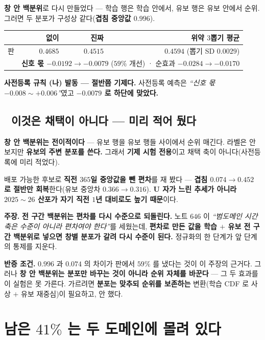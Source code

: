 \documentclass[10pt,a4paper]{article}
\newcommand{\claim}[2]{\begin{claimbox}\textbf{주장.} #1\par\smallskip
  \textcolor{gray!70}{\textbf{반증 조건.} #2}\end{claimbox}}
\begin{document}
\textbf{창 안 백분위}로 다시 만들었다 --- 학습 행은 학습 안에서, 유보 행은 유보
안에서 순위. 그러면 두 분포가 구성상 같다(\textbf{겹침 중앙값 $0.996$}).

\begin{center}
\begin{tabular}{lrrr}
\toprule
& 없이 & 진짜 & 위약 $3$뽑기 평균 \\
\midrule
판 & $0.4685$ & $\mathbf{0.4515}$ & $0.4594$ (뽑기 SD $0.0029$) \\
\midrule
& \multicolumn{3}{l}{\textbf{신호 몫 $-0.0192 \to \mathbf{-0.0079}$} ($59\%$ 개선) ·
순효과 $-0.0284 \to -0.0170$} \\
\bottomrule
\end{tabular}
\end{center}

\textbf{사전등록 규칙 (나) 발동 --- 절반쯤 기제다.} 사전등록 예측은 \emph{``신호 몫
$-0.008 \sim +0.006$''}였고 \textbf{$-0.0079$ 로 하단에 맞았다.}

\subsection*{🔴 이것은 채택이 아니다 --- 미리 적어 뒀다}

\textbf{창 안 백분위는 전이적이다} --- 유보 행을 유보 행들 사이에서 순위 매긴다.
라벨은 안 보지만 \textbf{유보의 주변 분포를 쓴다.} 그래서 \textbf{기제 시험 전용}이고
채택 축이 아니다(사전등록에 미리 적었다).

배포 가능한 후보로 \textbf{직전 $365$일 중앙값을 뺀 편차}를 재 봤다 --- \textbf{겹침
$0.074 \to 0.452$ 로 절반만 회복}한다(유보 중앙차 $0.366 \to 0.316$). \textbf{U 자가
느린 추세가 아니라 $2025{\sim}26$ 산포가 자기 직전 $1$년 대비로도 높기 때문}이다.

\claim{\textbf{전 구간 백분위는 편차를 다시 수준으로 되돌린다.} 노트 $646$ 이
\emph{``범도메인 시간축은 수준이 아니라 편차여야 한다''}를 세웠는데, \textbf{편차로
만든 값을 학습 $+$ 유보 전 구간 백분위로 넣으면 창별 분포가 갈려 다시 수준이 된다.}
정규화의 한 단계가 앞 단계의 통제를 지운다.}
{$0.996$ 과 $0.074$ 의 차이가 판에서 $59\%$ 를 냈다는 것이 이 주장의 근거다. 그러나
\textbf{창 안 백분위는 분포만 바꾸는 것이 아니라 순위 자체를 바꾼다} --- 그 두 효과를
이 실험은 못 가른다. 가르려면 \textbf{분포는 맞추되 순위를 보존하는} 변환(학습 CDF
로 사상 $+$ 유보 재중심)이 필요하고, 안 했다.}

\section{남은 $41\%$ 는 두 도메인에 몰려 있다}
\end{document}
